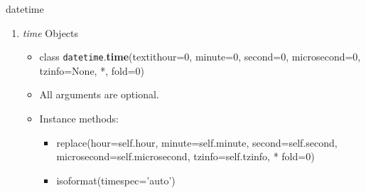 \documentclass[xcolor=table]{mysld}
\begin{document}
\begin{frame}[allowframebreaks]{datetime}
\begin{enumerate}
\begin{itemize}
\begin{itemize}
\end{itemize}
\end{itemize}
\framebreak
\item \textit{time} Objects
\begin{itemize}
\item class \texttt{datetime}.\textbf{time}(textit{hour=0, minute=0, second=0, microsecond=0, tzinfo=None, *, fold=0})
\item All arguments are optional.
\item Instance methods:
\begin{itemize}
\item replace(hour=self.hour, minute=self.minute, second=self.second, microsecond=self.microsecond, tzinfo=self.tzinfo, * fold=0)
\item isoformat(timespec='auto')
\end{itemize}
\end{itemize}
\end{enumerate}
\end{frame}
\end{document}
